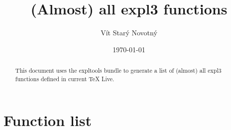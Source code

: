 \documentclass{article}
\title{(Almost) all expl3 functions}
\author{Vít Starý Novotný}
\date{\today}
\begin{document}
\maketitle
\begin{abstract}
This document uses the expltools bundle to generate a list of (almost) all
expl3 functions defined in current \TeX{} Live.
\end{abstract}
\tableofcontents
\section{Function list}

\printindex[functions]
\printindex[files]
\end{document}
